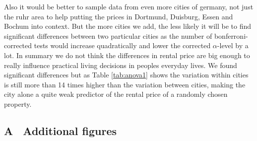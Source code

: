 \documentclass[12 pt]{scrartcl}
\begin{document}
Also it would be better to sample data from even more cities of germany, not just the ruhr area to help putting the prices in Dortmund, Duisburg, Essen and Bochum into context. But the more cities we add, the less likely it will be to find significant differences between two particular cities as the number of bonferroni-corrected tests would increase quadratically and lower the corrected $\alpha$-level by a lot.
In summary we do not think the differences in rental price are big enough to really influence practical living decisions in peoples everyday lives. We found significant differences but as Table \ref{tab:anova1} shows the variation within cities is still more than 14 times higher than the variation between cities, making the city alone a quite weak predictor of the rental price of a randomly chosen property.


\newpage
{}
\renewcommand\refname{Bibliography}



\newpage
\appendix
{}
\subsection*{A \ Additional figures}
\end{document}
